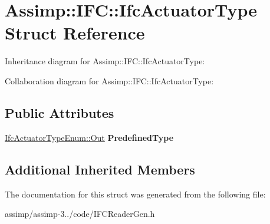 \hypertarget{struct_assimp_1_1_i_f_c_1_1_ifc_actuator_type}{\section{Assimp\+:\+:I\+F\+C\+:\+:Ifc\+Actuator\+Type Struct Reference}
\label{struct_assimp_1_1_i_f_c_1_1_ifc_actuator_type}
}


Inheritance diagram for Assimp\+:\+:I\+F\+C\+:\+:Ifc\+Actuator\+Type\+:


Collaboration diagram for Assimp\+:\+:I\+F\+C\+:\+:Ifc\+Actuator\+Type\+:
\subsection*{Public Attributes}
\begin{DoxyCompactItemize}
\item 
\hypertarget{struct_assimp_1_1_i_f_c_1_1_ifc_actuator_type_a95c4f4dc9b877cf63593785237c3829d}{\hyperlink{classboost_1_1shared__ptr}{Ifc\+Actuator\+Type\+Enum\+::\+Out} {\bfseries Predefined\+Type}}\label{struct_assimp_1_1_i_f_c_1_1_ifc_actuator_type_a95c4f4dc9b877cf63593785237c3829d}

\end{DoxyCompactItemize}
\subsection*{Additional Inherited Members}


The documentation for this struct was generated from the following file\+:\begin{DoxyCompactItemize}
\item 
assimp/assimp-\/3../code/I\+F\+C\+Reader\+Gen.\+h\end{DoxyCompactItemize}
